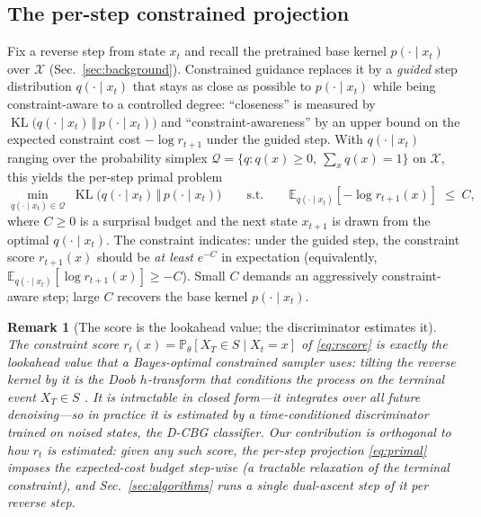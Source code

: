 \documentclass{article}
\newtheorem{remark}{Remark}
\DeclareMathOperator{\KL}{KL}
\newcommand{\E}{\mathbb{E}}
\newcommand{\X}{\mathcal{X}}
\newcommand{\Q}{\mathcal{Q}}
\begin{document}
\subsection{The per-step constrained projection}
\label{sec:perstep}
Fix a reverse step from state $x_t$ and recall the pretrained base kernel $p(\cdot\mid x_t)$ over $\X$ (Sec.~\ref{sec:background}). Constrained guidance replaces it by a \emph{guided} step distribution $q(\cdot\mid x_t)$ that stays as close as possible to $p(\cdot\mid x_t)$ while being constraint-aware to a controlled degree: ``closeness'' is measured by $\KL\big(q(\cdot\mid x_t)\,\Vert\,p(\cdot\mid x_t)\big)$ and ``constraint-awareness'' by an upper bound on the expected constraint cost $-\log r_{t+1}$ under the guided step. With $q(\cdot\mid x_t)$ ranging over the probability simplex $\Q=\{q:q(x)\ge0,\ \sum_x q(x)=1\}$ on $\X$, this yields the per-step primal problem
\begin{equation}
\label{eq:primal}
\min_{q(\cdot\mid x_t)\in\Q}\; \KL\big(q(\cdot\mid x_t)\,\big\Vert\, p(\cdot\mid x_t)\big)
\qquad\text{s.t.}\qquad
\E_{q(\cdot\mid x_t)}\!\left[-\log r_{t+1}(x)\right]\;\le\;C,
\end{equation}
where $C\ge 0$ is a surprisal budget and the next state $x_{t+1}$ is drawn from the optimal $q(\cdot\mid x_t)$. The constraint indicates: under the guided step, the constraint score $r_{t+1}(x)$ should be \emph{at least} $e^{-C}$ in expectation (equivalently, $\E_{q(\cdot\mid x_t)}[\log r_{t+1}(x)]\ge -C$). Small $C$ demands an aggressively constraint-aware step; large $C$ recovers the base kernel $p(\cdot\mid x_t)$.

\begin{remark}[The score is the lookahead value; the discriminator estimates it]
\label{rmk:myopic}
The constraint score $r_t(x)=\mathbb P_\theta[X_T\in S\mid X_t=x]$ of \eqref{eq:rscore} is exactly the \emph{lookahead value} that a Bayes-optimal constrained sampler uses: tilting the reverse kernel by it is the Doob $h$-transform that conditions the process on the terminal event $X_T\in S$ \cite{wu2023practical,zhao2024probabilistic}. It is intractable in closed form---it integrates over all future denoising---so in practice it is estimated by a time-conditioned discriminator trained on noised states, the D-CBG classifier. Our contribution is orthogonal to how $r_t$ is estimated: given any such score, the per-step projection \eqref{eq:primal} imposes the expected-cost budget step-wise (a tractable relaxation of the terminal constraint), and Sec.~\ref{sec:algorithms} runs a single dual-ascent step of it per reverse step.
\end{remark}
\end{document}
